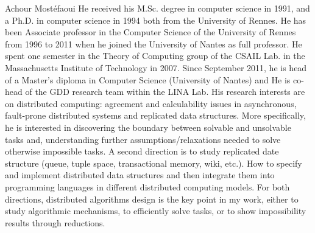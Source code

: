 \begin{IEEEbiography}
{Achour Most{\'e}faoui} He received his M.Sc. degree in computer science in
1991, and a Ph.D. in computer science in 1994 both from the University of
Rennes. He has been Associate professor in the Computer Science of the
University of Rennes from 1996 to 2011 when he joined the University of Nantes
as full professor.  He spent one semester in the Theory of Computing group of
the CSAIL Lab. in the Massachusetts Institute of Technology in 2007.  Since
September 2011, he is head of a Master's diploma in Computer Science (University
of Nantes) and He is co-head of the GDD research team within the LINA Lab.  His
research interests are on distributed computing: agreement and calculability
issues in asynchronous, fault-prone distributed systems and replicated data
structures.  More specifically, he is interested in discovering the boundary
between solvable and unsolvable tasks and, understanding further
assumptions/relaxations needed to solve otherwise impossible tasks.  A second
direction is to study replicated date structure (queue, tuple space,
transactional memory, wiki, etc.).  How to specify and implement distributed
data structures and then integrate them into programming languages in different
distributed computing models. For both directions, distributed algorithms design
is the key point in my work, either to study algorithmic mechanisms, to
efficiently solve tasks, or to show impossibility results through reductions.
\end{IEEEbiography}

